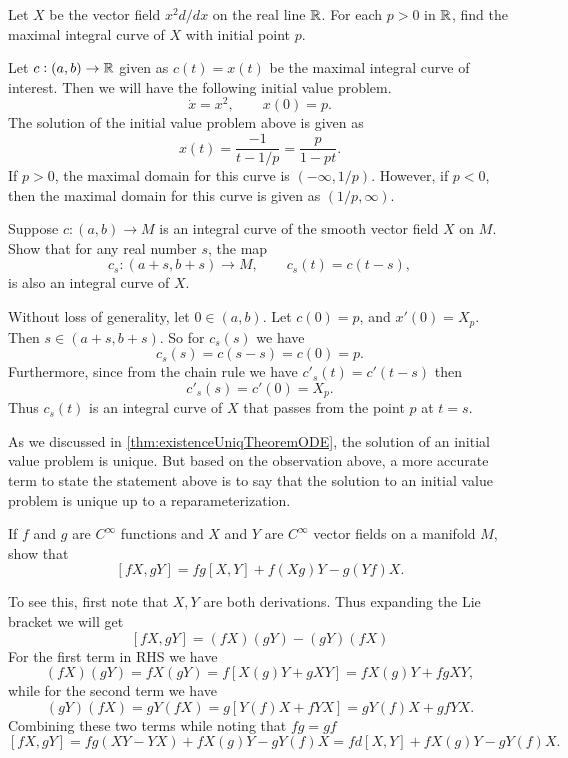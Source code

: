 \begin{problem}
	Let $ X $ be the vector field $ x^2 d/dx $ on the real line $ \mathbb{R} $. For each $ p > 0 $ in $ \mathbb{R} $, find the maximal integral curve of $ X $ with initial point $ p $.
\end{problem}
\begin{solution}
	Let $ c: (a,b) \to \mathbb{R}$ given as $ c(t) = x(t) $ be the maximal integral curve of interest. Then we will have the following initial value problem.
	\[ \dot{x} = x^2, \qquad x(0) = p. \]
	The solution of the initial value problem above is given as 
	\[ x(t) = \frac{-1}{t - 1/p} = \frac{p}{1-pt}.  \]
	If $ p > 0 $, the maximal domain for this curve is $ (-\infty, 1/p) $. However, if $ p < 0 $, then the maximal domain for this curve is given as $ (1/p,\infty) $.
\end{solution}

\begin{problem}
	Suppose $ c: (a,b) \to M $ is an integral curve of the smooth vector field $ X $ on $ M $. Show that for any real number $ s $, the map
	\[ c_s: (a+s,b+s) \to M, \qquad c_s(t) = c(t-s), \] 
	is also an integral curve of $ X $.
\end{problem}
\begin{solution}
	Without loss of generality, let $ 0 \in (a,b) $. Let $ c(0) = p $, and $ x'(0) = X_p $. Then $ s \in (a+s, b+s) $. So for $ c_s(s) $ we have
	\[ c_s(s) = c(s-s) = c(0) = p. \]
	Furthermore, since from the chain rule we have $ c'_s(t) = c'(t-s) $ then 
	\[ c'_s(s) = c'(0) = X_p. \]
	Thus $ c_s(t) $ is an integral curve of $ X $ that passes from the point $ p $ at $ t = s $.
	\begin{observation}
		As we discussed in \autoref{thm:existenceUniqTheoremODE}, the solution of an initial value problem is unique. But based on the observation above, a more accurate term to state the statement above is to say that the solution to an initial value problem is unique up to a reparameterization.
	\end{observation}
\end{solution}

\begin{problem}
	If $ f $ and $ g $ are $ C^\infty $ functions and $ X $ and $ Y $ are $ C^\infty $ vector fields on a manifold $ M $, show that 
	\[ [fX, gY] = fg[X,Y] + f(Xg)Y - g(Yf)X. \]
\end{problem}
\begin{solution}
	To see this, first note that $ X,Y $ are both derivations. Thus expanding the Lie bracket we will get
	\[ [fX,gY] = (fX)(gY) - (gY)(fX) \]
	For the first term in RHS we have
	\[ (fX)(gY) = fX(gY) = f[X(g)Y + gXY] = fX(g)Y + fg XY, \]
	while for the second term we have
	\[ (gY)(fX) = gY(fX) = g[Y(f)X + fYX] = gY(f)X + gf YX. \]
	Combining these two terms while noting that $ fg = gf $
	\[ [fX,gY] = fg (XY - YX) + fX(g)Y - gY(f)X = fd[X,Y] + fX(g)Y - gY(f)X. \]
\end{solution}

